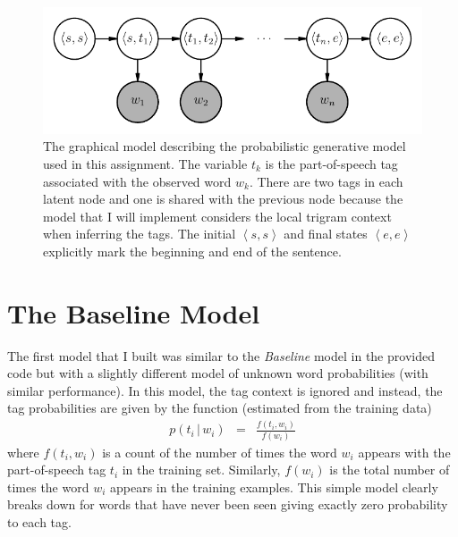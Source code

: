 \documentclass[11pt]{article}
\newcommand{\eqlabel}[1]{\label{eq:#1}}
\newcommand{\figlabel}[1]{\label{fig:#1}}
\begin{document}
\begin{figure}[htbp]
\begin{center}
    \includegraphics{pgm.pdf}
\end{center}
\caption{%
The graphical model describing the probabilistic generative model used in this
assignment.
The variable $t_k$ is the part-of-speech tag associated with the observed
word $w_k$.
There are two tags in each latent node and one is shared with the previous
node because the model that I will implement considers the local trigram
context when inferring the tags.
The initial $\left <s,s\right >$ and final states $\left < e,e \right >$
explicitly mark the beginning and end of the sentence.
\figlabel{pgm}}
\end{figure}

\section{The Baseline Model}

The first model that I built was similar to the \emph{Baseline} model in the
provided code but with a slightly different model of unknown word
probabilities (with similar performance).
In this model, the tag context is ignored and instead, the tag probabilities
are given by the function (estimated from the training data)
\begin{eqnarray}\eqlabel{cond-emission}
p(t_i\,|\,w_i) &=& \frac{f(t_i,w_i)}{f(w_i)}
\end{eqnarray}
where $f(t_i, w_i)$ is a count of the number of times the word $w_i$ appears
with the part-of-speech tag $t_i$ in the training set.
Similarly, $f(w_i)$ is the total number of times the word $w_i$ appears in the
training examples.
This simple model clearly breaks down for words that have never been seen
giving exactly zero probability to each tag.
\end{document}
